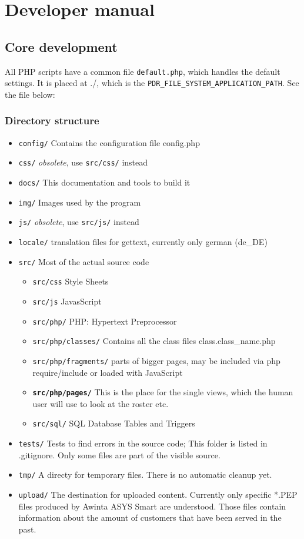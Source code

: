
\chapter{Developer manual}
\section{Core development}
All PHP scripts have a common file \texttt{default.php}, which handles the default settings. It is placed at ./, which is the \texttt{PDR\_FILE\_SYSTEM\_APPLICATION\_PATH}.
See the file below:


\subsection{Directory structure}
\begin{itemize}
\item \texttt{config/} Contains the configuration file config.php
\item \texttt{css/} \emph{obsolete}, use \texttt{src/css/} instead
\item \texttt{docs/} This documentation and tools to build it
\item \texttt{img/} Images used by the program
\item \texttt{js/}  \emph{obsolete}, use \texttt{src/js/} instead
\item \texttt{locale/} translation files for gettext, currently only german (de\_DE)
\item \texttt{src/} Most of the actual source code
    \begin{itemize}
    \item \texttt{src/css} Style Sheets
    \item \texttt{src/js} JavasScript
    \item \texttt{src/php/} PHP: Hypertext Preprocessor
    \item \texttt{src/php/classes/} Contains all the class files class.class\_name.php
    \item \texttt{src/php/fragments/} parts of bigger pages, may be included via php require/include or loaded with JavaScript
    \item \texttt{\textbf{src/php/pages/}} This is the place for the single views, which the human user will use to look at the roster etc.
    \item \texttt{src/sql/} SQL Database Tables and Triggers
    \end{itemize}
\item \texttt{tests/} Tests to find errors in the source code; This folder is listed in .gitignore. Only some files are part of the visible source.
\item \texttt{tmp/} A directy for temporary files. There is no automatic cleanup yet.
\item \texttt{upload/} The destination for uploaded content. Currently only specific *.PEP files produced by Awinta ASYS Smart are understood. Those files contain information about the amount of customers that have been served in the past.
\end{itemize}
